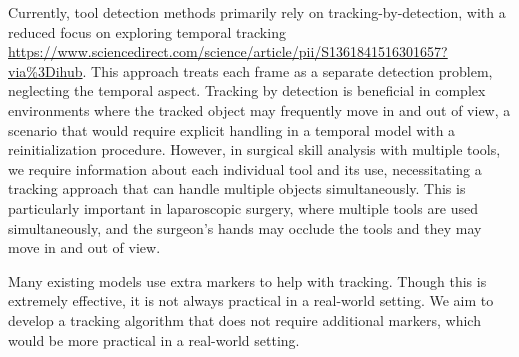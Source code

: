 
Currently, tool detection methods primarily rely on tracking-by-detection, with a reduced focus on exploring temporal tracking \url{https://www.sciencedirect.com/science/article/pii/S1361841516301657?via%3Dihub}. This approach treats each frame as a separate detection problem, neglecting the temporal aspect. Tracking by detection is beneficial in complex environments where the tracked object may frequently move in and out of view, a scenario that would require explicit handling in a temporal model with a reinitialization procedure. However, in surgical skill analysis with multiple tools, we require information about each individual tool and its use, necessitating a tracking approach that can handle multiple objects simultaneously. This is particularly important in laparoscopic surgery, where multiple tools are used simultaneously, and the surgeon's hands may occlude the tools and they may move in and out of view.



Many existing models use extra markers to help with tracking. Though this is extremely effective, it is not always practical in a real-world setting. We aim to develop a tracking algorithm that does not require additional markers, which would be more practical in a real-world setting. 

